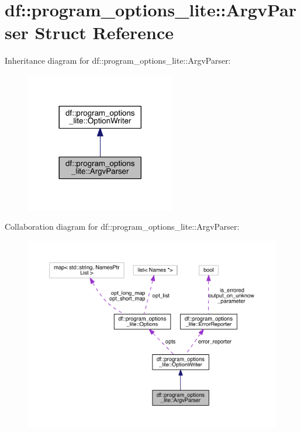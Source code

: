 \hypertarget{structdf_1_1program__options__lite_1_1_argv_parser}{}\section{df\+:\+:program\+\_\+options\+\_\+lite\+:\+:Argv\+Parser Struct Reference}
\label{structdf_1_1program__options__lite_1_1_argv_parser}


Inheritance diagram for df\+:\+:program\+\_\+options\+\_\+lite\+:\+:Argv\+Parser\+:
\nopagebreak
\begin{figure}[H]
\begin{center}
\leavevmode
\includegraphics[width=185pt]{de/d0c/structdf_1_1program__options__lite_1_1_argv_parser__inherit__graph}
\end{center}
\end{figure}


Collaboration diagram for df\+:\+:program\+\_\+options\+\_\+lite\+:\+:Argv\+Parser\+:
\nopagebreak
\begin{figure}[H]
\begin{center}
\leavevmode
\includegraphics[width=350pt]{d4/d3a/structdf_1_1program__options__lite_1_1_argv_parser__coll__graph}
\end{center}
\end{figure}
